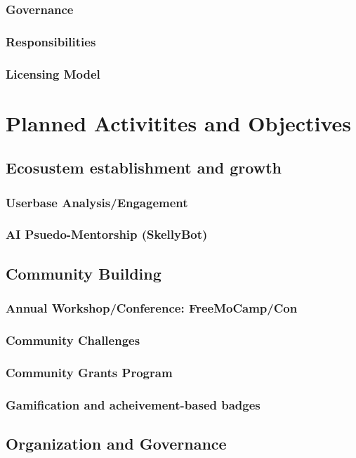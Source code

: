 \documentclass[11pt]{article}
\begin{document}
\subsubsection{Governance}
\subsubsection{Responsibilities}
\subsubsection{Licensing Model}

\section{Planned Activitites and Objectives}

\subsection{Ecosustem establishment and growth}
\subsubsection{Userbase Analysis/Engagement}
\subsubsection{AI Psuedo-Mentorship (SkellyBot)}

\subsection{Community Building}
\subsubsection{Annual Workshop/Conference: FreeMoCamp/Con}
\subsubsection{Community Challenges}
\subsubsection{Community Grants Program}
\subsubsection{Gamification and acheivement-based badges}

\subsection{Organization and Governance}
\end{document}
